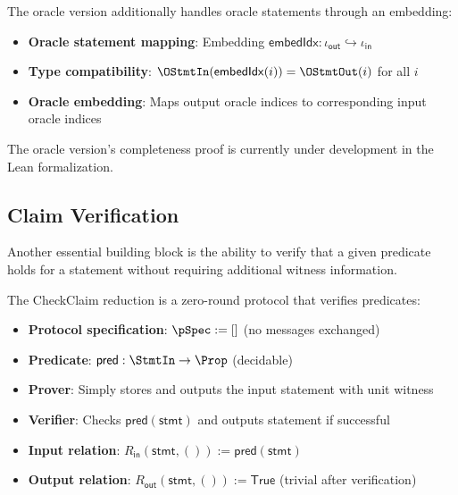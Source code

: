 \begin{definition}
    \label{def:reduceclaim_oracle_reduction}
    The oracle version additionally handles oracle statements through an embedding:
    \begin{itemize}
        \item \textbf{Oracle statement mapping}: Embedding $\mathsf{embedIdx} : \iota_{\mathsf{out}} \hookrightarrow \iota_{\mathsf{in}}$
        \item \textbf{Type compatibility}: $\OStmtIn(\mathsf{embedIdx}(i)) = \OStmtOut(i)$ for all $i$
        \item \textbf{Oracle embedding}: Maps output oracle indices to corresponding input oracle indices
    \end{itemize}
\end{definition}

\begin{remark}
    The oracle version's completeness proof is currently under development in the Lean formalization.
\end{remark}

\subsection{Claim Verification}

Another essential building block is the ability to verify that a given predicate holds for a statement without requiring additional witness information.

\begin{definition}
    \label{def:checkclaim_reduction}
    The CheckClaim reduction is a zero-round protocol that verifies predicates:
    \begin{itemize}
        \item \textbf{Protocol specification}: $\pSpec := []$ (no messages exchanged)
        \item \textbf{Predicate}: $\mathsf{pred} : \StmtIn \to \Prop$ (decidable)
        \item \textbf{Prover}: Simply stores and outputs the input statement with unit witness
        \item \textbf{Verifier}: Checks $\mathsf{pred}(\mathsf{stmt})$ and outputs statement if successful
        \item \textbf{Input relation}: $R_{\mathsf{in}}(\mathsf{stmt}, ()) := \mathsf{pred}(\mathsf{stmt})$
        \item \textbf{Output relation}: $R_{\mathsf{out}}(\mathsf{stmt}, ()) := \mathsf{True}$ (trivial after verification)
    \end{itemize}
\end{definition}

